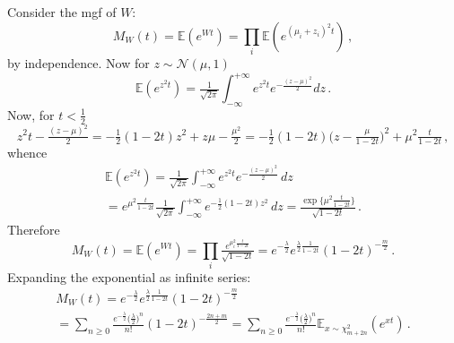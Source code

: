 \documentclass[a4paper,10pt]{article}
\begin{document}
Consider the mgf of $W$:
$$
M_W(t)
  = \mathbb{E}(e^{Wt})
  = \prod_i \mathbb{E}(e^{(\mu_i + z_i)^2 t})
  \,, $$
by independence. Now for $z \sim \mathcal{N}(\mu, 1)$
$$
\mathbb{E}(e^{z^2 t})
  = \tfrac1{\sqrt{2\pi}}
  \int_{-\infty}^{+\infty}
      e^{z^2 t} e^{-\tfrac{(z-\mu)^2}2}
  dz
  \,. $$
Now, for $t < \tfrac12$
$$
z^2 t - \tfrac{(z - \mu)^2}2
  = - \tfrac12 (1 - 2t) z^2 + z \mu - \tfrac{\mu^2}2
  = - \tfrac12 (1 - 2t) \bigl( z - \tfrac\mu{1 - 2t} \bigr)^2
    + \mu^2 \tfrac{t}{1 - 2t}
  \,, $$
whence
\begin{multline}
  \mathbb{E}(e^{z^2 t})
    = \tfrac1{\sqrt{2\pi}}
      \int_{-\infty}^{+\infty}
        e^{z^2 t} e^{-\tfrac{(z-\mu)^2}2}
      \, dz
    \\= e^{\mu^2 \tfrac{t}{1 - 2t}}
      \tfrac1{\sqrt{2\pi}}
      \int_{-\infty}^{+\infty}
        e^{- \tfrac12 (1 - 2t) z^2}
      \, dz
    = \tfrac{
        \exp{\{\mu^2 \tfrac{t}{1 - 2t}\}}
    }{\sqrt{1 - 2t}}
    \,.
\end{multline}
Therefore
$$
M_W(t)
  = \mathbb{E}(e^{Wt})
  = \prod_i \tfrac{
      e^{\mu_i^2 \tfrac{t}{1 - 2t}}
    }{\sqrt{1 - 2t}}
  = e^{- \tfrac\lambda2} e^{\tfrac\lambda2 \tfrac1{1 - 2t}}
  (1 - 2t)^{-\tfrac{m}2}
  \,. $$
Expanding the exponential as infinite series:
\begin{multline}
  M_W(t)
    = e^{- \tfrac\lambda2} e^{\tfrac\lambda2 \tfrac1{1 - 2t}}
    (1 - 2t)^{-\tfrac{m}2}
    \\= \sum_{n \geq 0} \tfrac{e^{- \tfrac\lambda2} \bigl(\tfrac\lambda2\bigr)^n}{n!}
        (1 - 2t)^{-\tfrac{2n + m}2}
    = \sum_{n \geq 0} \tfrac{e^{- \tfrac\lambda2} \bigl(\tfrac\lambda2\bigr)^n}{n!}
        \mathbb{E}_{x \sim \chi^2_{m + 2n}}(e^{x t})
    \,.
\end{multline}
\end{document}
